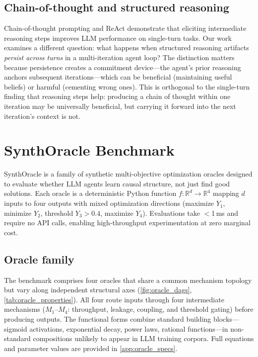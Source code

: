 \documentclass[11pt,letterpaper]{article}
\begin{document}
\subsection{Chain-of-thought and structured reasoning}

Chain-of-thought prompting \cite{wei2022chainofthought} and ReAct
\cite{yao2023react} demonstrate that eliciting intermediate reasoning
steps improves LLM performance on single-turn tasks. Our work examines a
different question: what happens when structured reasoning artifacts
\emph{persist across turns} in a multi-iteration agent loop? The
distinction matters because persistence creates a commitment device---the
agent's prior reasoning anchors subsequent iterations---which can be
beneficial (maintaining useful beliefs) or harmful (cementing wrong ones).
This is orthogonal to the single-turn finding that reasoning steps help:
producing a chain of thought within one iteration may be universally
beneficial, but carrying it forward into the next iteration's context is
not.

\section{SynthOracle Benchmark}
\label{sec:benchmark}

SynthOracle is a family of synthetic multi-objective optimization oracles
designed to evaluate whether LLM agents learn causal structure, not just
find good solutions. Each oracle is a deterministic Python function
$f: \mathbb{R}^d \to \mathbb{R}^4$ mapping $d$ inputs to four outputs
with mixed optimization directions (maximize $Y_1$, minimize $Y_2$,
threshold $Y_3 > 0.4$, maximize $Y_4$). Evaluations take $<$1\,ms and
require no API calls, enabling high-throughput experimentation at zero
marginal cost.

\subsection{Oracle family}

The benchmark comprises four oracles that share a common mechanism
topology but vary along independent structural axes
(\cref{fig:oracle_dags}, \cref{tab:oracle_properties}). All four route
inputs through four intermediate mechanisms ($M_1$--$M_4$: throughput,
leakage, coupling, and threshold gating) before producing outputs. The
functional forms combine standard building blocks---sigmoid activations,
exponential decay, power laws, rational functions---in non-standard
compositions unlikely to appear in LLM training corpora. Full equations
and parameter values are provided in \cref{app:oracle_specs}.
\end{document}
